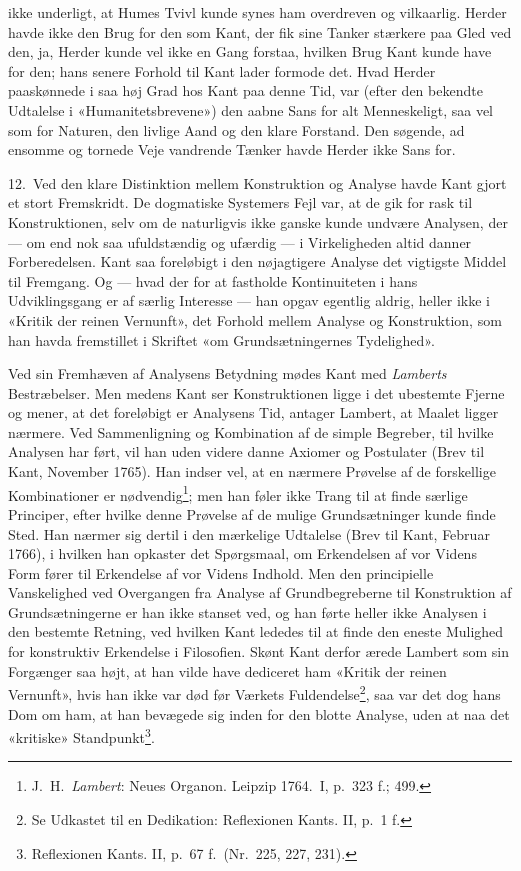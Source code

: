 \documentclass[12pt,a4paper]{article}
\newcommand{\apage}[1]{\marginnote{\footnotesize\textit{[#1]}}}
\begin{document}
ikke underligt, at Humes Tvivl kunde synes ham overdreven og vilkaarlig.
Herder havde ikke den Brug for den som Kant, der fik sine Tanker stærkere
paa Gled ved den, ja, Herder kunde vel ikke en Gang forstaa, hvilken Brug
Kant kunde have for den; hans senere Forhold til Kant lader formode det.
Hvad Herder paaskønnede i saa høj Grad hos Kant paa denne Tid, var (efter
den bekendte Udtalelse i «Humanitetsbrevene») den aabne Sans for alt
Menneskeligt, saa vel som for Naturen, den livlige Aand og den klare
Forstand. Den søgende, ad ensomme og tornede Veje vandrende Tænker havde
Herder ikke Sans for.

12.\ Ved den klare Distinktion mellem Konstruktion og Analyse havde Kant
gjort et stort Fremskridt. De dogmatiske Systemers Fejl var, at de gik
for rask til Konstruktionen, selv om de naturligvis ikke ganske kunde
undvære Analysen, der --- om end nok saa ufuldstændig og ufærdig --- i
Virkeligheden altid danner Forberedelsen. Kant saa foreløbigt i den
nøjagtigere Analyse det vigtigste Middel til Fremgang. Og --- hvad der
for at fastholde Kontinuiteten i hans Udviklingsgang er af særlig
Interesse --- han opgav egentlig aldrig, heller ikke i «Kritik der reinen
Vernunft», det Forhold mellem Analyse og Konstruktion, som han havda
fremstillet i Skriftet «om Grundsætningernes Tydelighed».

Ved sin Fremhæven af Analysens Betydning mødes Kant med \emph{Lamberts}
Bestræbelser. Men medens Kant ser Konstruktionen ligge i det ubestemte
Fjerne og mener, at det foreløbigt er Analysens Tid, antager Lambert, at
Maalet ligger nærmere. Ved Sammenligning og Kombination af de simple
Begreber, til hvilke Analysen har ført, vil han uden videre danne
Axiomer og Postulater (Brev til Kant, November 1765). Han indser vel, at
en nærmere Prøvelse af de forskellige Kombinationer er
nødvendig\footnote{J.\ H.\ \emph{Lambert}: Neues Organon. Leipzip
1764.\ I, p.\ 323 f.; 499.}; men han føler ikke Trang til at finde særlige
Principer, efter hvilke denne Prøvelse af de mulige Grundsætninger kunde
finde Sted. Han nærmer sig dertil i den mærkelige Udtalelse (Brev til
\apage{26} Kant, Februar 1766), i hvilken han opkaster det Spørgsmaal, om
Erkendelsen af vor Videns Form fører til Erkendelse af vor Videns Indhold.
Men den principielle Vanskelighed ved Overgangen fra Analyse af
Grundbegreberne til Konstruktion af Grundsætningerne er han ikke stanset
ved, og han førte heller ikke Analysen i den bestemte Retning, ved hvilken
Kant lededes til at finde den eneste Mulighed for konstruktiv Erkendelse i
Filosofien. Skønt Kant derfor ærede Lambert som sin Forgænger saa højt,
at han vilde have dediceret ham «Kritik der reinen Vernunft», hvis han
ikke var død før Værkets Fuldendelse\footnote{Se Udkastet til en
Dedikation: Reflexionen Kants. II, p.\ 1 f.}, saa var det dog
hans Dom om ham, at han bevægede sig inden for den blotte Analyse, uden at
naa det «kritiske» Standpunkt\footnote{Reflexionen Kants. II,
p.\ 67 f.\ (Nr.\ 225, 227, 231).}.
\end{document}

